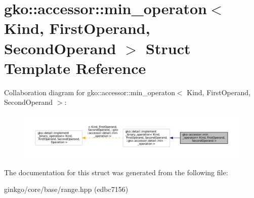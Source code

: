 \hypertarget{structgko_1_1accessor_1_1min__operaton}{}\section{gko\+:\+:accessor\+:\+:min\+\_\+operaton$<$ Kind, First\+Operand, Second\+Operand $>$ Struct Template Reference}
\label{structgko_1_1accessor_1_1min__operaton}


Collaboration diagram for gko\+:\+:accessor\+:\+:min\+\_\+operaton$<$ Kind, First\+Operand, Second\+Operand $>$\+:
\nopagebreak
\begin{figure}[H]
\begin{center}
\leavevmode
\includegraphics[width=350pt]{structgko_1_1accessor_1_1min__operaton__coll__graph}
\end{center}
\end{figure}


The documentation for this struct was generated from the following file\+:\begin{DoxyCompactItemize}
\item 
ginkgo/core/base/range.\+hpp (edbc7156)\end{DoxyCompactItemize}
